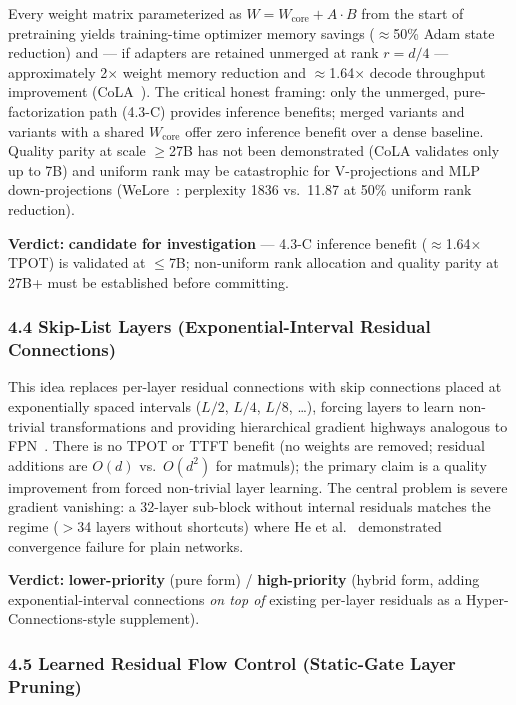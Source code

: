 \documentclass[11pt]{article}
\begin{document}
Every weight matrix parameterized as $W = W_{\text{core}} + A \cdot B$ from the start of pretraining yields training-time optimizer memory savings ($\approx$50\% Adam state reduction) and --- if adapters are retained unmerged at rank $r = d/4$ --- approximately 2$\times$ weight memory reduction and $\approx$1.64$\times$ decode throughput improvement (CoLA~\cite{Liu2025CoLA}).
The critical honest framing: only the unmerged, pure-factorization path (4.3-C) provides inference benefits; merged variants and variants with a shared $W_{\text{core}}$ offer zero inference benefit over a dense baseline.
Quality parity at scale $\geq$27B has not been demonstrated (CoLA validates only up to 7B) and uniform rank may be catastrophic for V-projections and MLP down-projections (WeLore~\cite{Wei2025WeLore}: perplexity 1836 vs.\ 11.87 at 50\% uniform rank reduction).

\textbf{Verdict:} \textbf{candidate for investigation} --- 4.3-C inference benefit ($\approx$1.64$\times$ TPOT) is validated at $\leq$7B; non-uniform rank allocation and quality parity at 27B+ must be established before committing.

\subsubsection{4.4 Skip-List Layers (Exponential-Interval Residual Connections)}
\label{sec:idea_4_4}

This idea replaces per-layer residual connections with skip connections placed at exponentially spaced intervals ($L/2$, $L/4$, $L/8$, \ldots), forcing layers to learn non-trivial transformations and providing hierarchical gradient highways analogous to FPN~\cite{Lin2017FPN}.
There is no TPOT or TTFT benefit (no weights are removed; residual additions are $O(d)$ vs.\ $O(d^2)$ for matmuls); the primary claim is a quality improvement from forced non-trivial layer learning.
The central problem is severe gradient vanishing: a 32-layer sub-block without internal residuals matches the regime ($>$34 layers without shortcuts) where He et al.~\cite{He2016ResNet} demonstrated convergence failure for plain networks.

\textbf{Verdict:} \textbf{lower-priority} (pure form) / \textbf{high-priority} (hybrid form, adding exponential-interval connections \emph{on top of} existing per-layer residuals as a Hyper-Connections-style supplement).

\subsubsection{4.5 Learned Residual Flow Control (Static-Gate Layer Pruning)}
\label{sec:idea_4_5}
\end{document}
